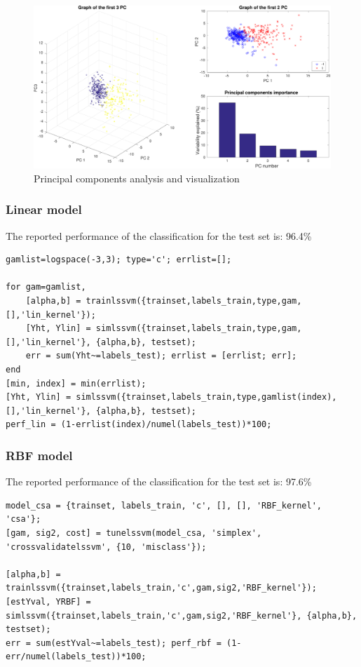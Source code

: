 \documentclass[11pt, a4paper]{article}
\begin{document}
\begin{figure}[H]
    \centering
    \includegraphics[scale=.40]{breast_pcaviz.pdf}
    \caption{Principal components analysis and visualization}
    \label{fig:breast_pcaviz}
\end{figure}

\subsubsection{Linear model}

The reported performance of the classification for the test set is: 96.4\%

\begin{lstlisting}
gamlist=logspace(-3,3); type='c'; errlist=[];

for gam=gamlist,
    [alpha,b] = trainlssvm({trainset,labels_train,type,gam,[],'lin_kernel'});
    [Yht, Ylin] = simlssvm({trainset,labels_train,type,gam,[],'lin_kernel'}, {alpha,b}, testset);
    err = sum(Yht~=labels_test); errlist = [errlist; err];
end
[min, index] = min(errlist);
[Yht, Ylin] = simlssvm({trainset,labels_train,type,gamlist(index),[],'lin_kernel'}, {alpha,b}, testset);
perf_lin = (1-errlist(index)/numel(labels_test))*100;
\end{lstlisting}

\subsubsection{RBF model}

The reported performance of the classification for the test set is: 97.6\%

\begin{lstlisting}
model_csa = {trainset, labels_train, 'c', [], [], 'RBF_kernel', 'csa'};
[gam, sig2, cost] = tunelssvm(model_csa, 'simplex', 'crossvalidatelssvm', {10, 'misclass'});

[alpha,b] = trainlssvm({trainset,labels_train,'c',gam,sig2,'RBF_kernel'});
[estYval, YRBF] = simlssvm({trainset,labels_train,'c',gam,sig2,'RBF_kernel'}, {alpha,b}, testset);
err = sum(estYval~=labels_test); perf_rbf = (1-err/numel(labels_test))*100;
\end{lstlisting}
\end{document}
